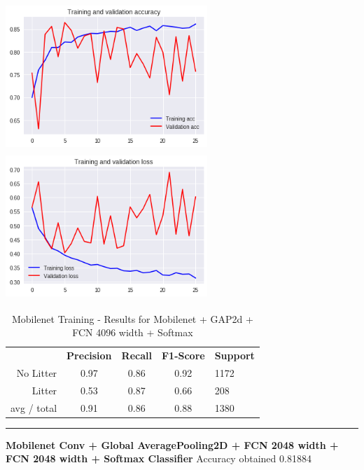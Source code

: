 \documentclass{IEEEtran}
\begin{document}
\includegraphics[width=3in,height=2.18in]{mobile/mobilenet-img009.png} 
\includegraphics[width=3in,height=2.18in]{mobile/mobilenet-img010.png} 


\begin{table}[ht]
\centering
\caption{Mobilenet Training - Results for Mobilenet + GAP2d + FCN 4096 width + Softmax}
\label{mobilenet1}
\begin{tabular}{rcccl}
\textbf{}   & \textbf{Precision} & \textbf{Recall} & \textbf{F1-Score} & \textbf{Support} \\
No Litter   & 0.97 &0.86 & 0.92 & 1172 \\
Litter      & 0.53 &0.87 & 0.66 & 208 \\
avg / total & 0.91 &0.86 & 0.88 & 1380 \\
\end{tabular}
\begin{center}\noindent\rule{10cm}{0.4pt}\end{center}
\end{table}

\bigskip


\bigskip
\textbf{Mobilenet Conv + Global AveragePooling2D + FCN 2048 width + FCN 2048 width + Softmax Classifier}\newline
Accuracy obtained 0.81884


\bigskip


\bigskip
\end{document}
